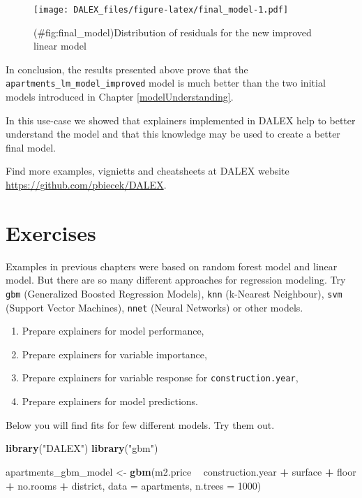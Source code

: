 \documentclass[]{book}
\newenvironment{Shaded}{\begin{snugshade}}{\end{snugshade}}
\newcommand{\DataTypeTok}[1]{\textcolor[rgb]{0.13,0.29,0.53}{#1}}
\newcommand{\DecValTok}[1]{\textcolor[rgb]{0.00,0.00,0.81}{#1}}
\newcommand{\KeywordTok}[1]{\textcolor[rgb]{0.13,0.29,0.53}{\textbf{#1}}}
\newcommand{\NormalTok}[1]{#1}
\newcommand{\OperatorTok}[1]{\textcolor[rgb]{0.81,0.36,0.00}{\textbf{#1}}}
\newcommand{\StringTok}[1]{\textcolor[rgb]{0.31,0.60,0.02}{#1}}
\providecommand{\tightlist}{%
  \setlength{\itemsep}{0pt}\setlength{\parskip}{0pt}}
\theoremstyle{definition}
\theoremstyle{definition}
\theoremstyle{definition}
\theoremstyle{remark}
\begin{document}
\begin{figure}
\centering
\texttt{[image: DALEX\_files/figure-latex/final\_model-1.pdf]}
\caption{(\#fig:final\_model)Distribution of residuals for the new
improved linear model}
\end{figure}

In conclusion, the results presented above prove that the
\texttt{apartments\_lm\_model\_improved} model is much better than the
two initial models introduced in Chapter \ref{modelUnderstanding}.

In this use-case we showed that explainers implemented in DALEX help to
better understand the model and that this knowledge may be used to
create a better final model.

Find more examples, vignietts and cheatsheets at DALEX website
\url{https://github.com/pbiecek/DALEX}.

\hypertarget{exercises}{%
\chapter{Exercises}\label{exercises}}

Examples in previous chapters were based on random forest model and
linear model. But there are so many different approaches for regression
modeling. Try \texttt{gbm} (Generalized Boosted Regression Models),
\texttt{knn} (k-Nearest Neighbour), \texttt{svm} (Support Vector
Machines), \texttt{nnet} (Neural Networks) or other models.

\begin{enumerate}
\def\labelenumi{\arabic{enumi}.}
\tightlist
\item
  Prepare explainers for model performance,
\item
  Prepare explainers for variable importance,
\item
  Prepare explainers for variable response for
  \texttt{construction.year},
\item
  Prepare explainers for model predictions.
\end{enumerate}

Below you will find fits for few different models. Try them out.

\begin{Shaded}
\begin{Highlighting}[]
\KeywordTok{library}\NormalTok{(}\StringTok{"DALEX"}\NormalTok{)}
\KeywordTok{library}\NormalTok{(}\StringTok{"gbm"}\NormalTok{)}

\NormalTok{apartments_gbm_model <-}\StringTok{ }\KeywordTok{gbm}\NormalTok{(m2.price }\OperatorTok{~}\StringTok{ }\NormalTok{construction.year }\OperatorTok{+}\StringTok{ }\NormalTok{surface }\OperatorTok{+}\StringTok{ }\NormalTok{floor }\OperatorTok{+}\StringTok{ }
\StringTok{                         }\NormalTok{no.rooms }\OperatorTok{+}\StringTok{ }\NormalTok{district, }\DataTypeTok{data =}\NormalTok{ apartments, }\DataTypeTok{n.trees =} \DecValTok{1000}\NormalTok{)}
\end{Highlighting}
\end{Shaded}
\end{document}
